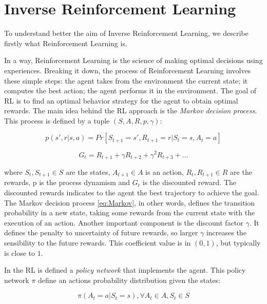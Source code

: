 \section{Inverse Reinforcement Learning}\label{IRL}

To understand better the aim of Inverse Reinforcement Learning, we describe firstly what Reinforcement Learning is.

In a way, Reinforcement Learning is the science of making optimal decisions using experiences. Breaking it down, the process of Reinforcement Learning involves these simple steps: the agent takes from the environment the current state; it computes the best action; the agent performs it in the environment. The goal of RL is to find an optimal behavior strategy for the agent to obtain optimal rewards.
The main idea behind the RL approach is the \textsl{Markov decision process}. This process is defined by a tuple $( S, A, R, p, \gamma)$:

\begin{equation}\label{eq:Markov}
     p(s', r | s, a) = Pr[ S_{t+1} = s', R_{t+1} = r | S_{t} = s, A_{t} = a ] 
\end{equation}

\begin{equation}\label{eq:discounted}
    G_{t} = R_{t+1} + \gamma R_{t+2} + {\gamma}^2 R_{t+3} + \dots
\end{equation}
     


 where $S_{t}, S_{t+1} \in S$ are the states, $A_{t+1} \in A$ is an action, $R_{t}, R_{t+1} \in R$ are the rewards, p is the process dynamism and $G_{t}$ is the discounted reward. The discounted rewards indicates to the agent the best trajectory to achieve the goal. \\
 The Markov decision process \ref{eq:Markov}, in other words, defines the transition probability in a new state, taking some rewards from the current state with the execution of an action. 
Another important component is the discount factor $\gamma$. It defines the penalty to uncertainty of future rewards, so larger $\gamma$ increases the sensibility to the future rewards.
This coefficient value is in $(0,1)$, but typically is close to $1$.

In the RL is defined a \textsl{policy network} that implements the agent. This policy network $\pi$ define an actions probability distribution given the states:

\begin{equation}
    \pi( A_{t} = a | S_{t} = s), \forall A_{t} \in A, S_{t} \in S
\end{equation}

